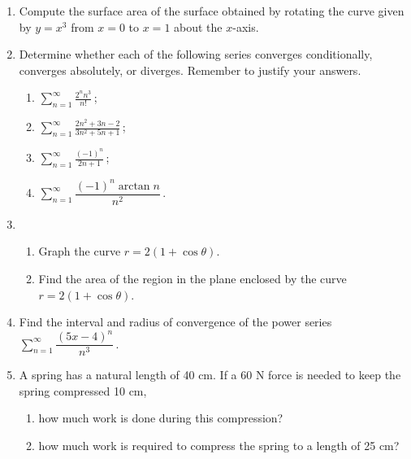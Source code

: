 \documentclass[10pt]{article}
\begin{document}
\begin{enumerate}
\item Compute the surface area of the surface obtained by rotating the curve given by $y=x^3$ from $x=0$ to $x=1$ about the $x$-axis.

\item Determine whether each of the following series converges conditionally, converges absolutely, or diverges. Remember to justify your answers.

\begin{multicols}{2}
\begin{enumerate}

\item $\displaystyle \sum_{n=1}^{\infty}\frac{2^n n^3}{n!}$\,;

\item $\displaystyle \sum_{n=1}^{\infty} \frac{2n^2+3n-2}{3n^2+5n+1}$\,;

\item $\displaystyle \sum_{n=1}^{\infty} \frac{(-1)^{n}}{2n+1}$\,;

\item $\displaystyle{\sum_{n=1}^{\infty} \dfrac{(-1)^n\arctan n}{n^2}}$\,.

\end{enumerate}
\end{multicols}

\item
\begin{enumerate}

\item Graph the curve $r=2(1+\cos \theta)$.

\item Find the area of the region in the plane enclosed by the curve $r=2(1+\cos \theta)$.

\end{enumerate}


\item Find the interval and radius of convergence of the power series $\displaystyle{\sum_{n=1}^{\infty}\dfrac{(5x-4)^n}{n^3}}$\,.


\item A spring has a natural length of 40 cm. If a 60 N force is needed to keep the spring compressed 10 cm,
\begin{enumerate}

\item how much work is done during this compression?

\item how much work is required to compress the spring to a length of 25 cm?


\end{enumerate}
\end{enumerate}
\end{document}
